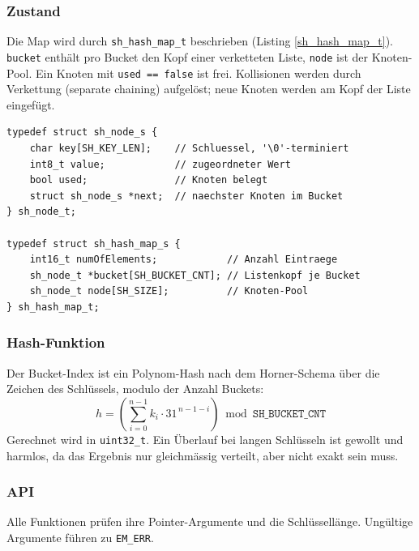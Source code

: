 \subsubsection*{Zustand}
Die Map wird durch \verb|sh_hash_map_t| beschrieben (Listing
\ref{sh_hash_map_t}). \verb|bucket| enthält pro Bucket den Kopf einer
verketteten Liste, \verb|node| ist der Knoten-Pool. Ein Knoten mit
\verb|used == false| ist frei. Kollisionen werden durch Verkettung
(\glqq separate chaining\grqq{}) aufgelöst; neue Knoten werden am Kopf der
Liste eingefügt.

\begin{listing}[H]
\begin{verbatim}
typedef struct sh_node_s {
    char key[SH_KEY_LEN];    // Schluessel, '\0'-terminiert
    int8_t value;            // zugeordneter Wert
    bool used;               // Knoten belegt
    struct sh_node_s *next;  // naechster Knoten im Bucket
} sh_node_t;

typedef struct sh_hash_map_s {
    int16_t numOfElements;            // Anzahl Eintraege
    sh_node_t *bucket[SH_BUCKET_CNT]; // Listenkopf je Bucket
    sh_node_t node[SH_SIZE];          // Knoten-Pool
} sh_hash_map_t;
\end{verbatim}
\caption{Definition der \texttt{sh\_hash\_map\_t} Struktur}
\label{sh_hash_map_t}
\end{listing}

\subsubsection*{Hash-Funktion}
Der Bucket-Index ist ein Polynom-Hash nach dem Horner-Schema über die
Zeichen des Schlüssels, modulo der Anzahl Buckets:
\[
h = \left(\sum_{i=0}^{n-1} k_i \cdot 31^{\,n-1-i}\right) \bmod
\mathtt{SH\_BUCKET\_CNT}
\]
Gerechnet wird in \verb|uint32_t|. Ein Überlauf bei langen Schlüsseln ist
gewollt und harmlos, da das Ergebnis nur gleichmässig verteilt, aber nicht
exakt sein muss.

\subsubsection*{API}
Alle Funktionen prüfen ihre Pointer-Argumente und die Schlüssellänge.
Ungültige Argumente führen zu \verb|EM_ERR|.

